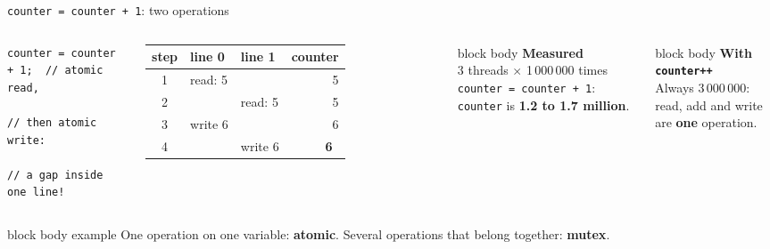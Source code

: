 \documentclass[aspectratio=169,10pt]{beamer}
\newcommand{\nok}{\textcolor{aWrite}{\faTimes}}
\newcommand{\stepbox}[2]{%
  \begin{beamercolorbox}[rounded=true,sep=0.09cm,wd=\linewidth]{block body}
    \footnotesize\textbf{#1}\\ #2
  \end{beamercolorbox}\vspace{0.06cm}}
\newcommand{\keymsg}[1]{%
  \begin{beamercolorbox}[rounded=true,sep=0.1cm,wd=\textwidth]{block body example}
    \centering\footnotesize #1
  \end{beamercolorbox}}
\begin{document}
\begin{frame}[fragile]{\texttt{counter = counter + 1}: two operations}
  \begin{columns}[c,onlytextwidth]
\begin{lstlisting}[style=cpp]
counter = counter + 1;  // atomic read,
                        // then atomic write:
                        // a gap inside one line!
\end{lstlisting}
      \vspace{0.2cm}
      \centering\footnotesize
      \renewcommand{\arraystretch}{1.15}
      \begin{tabular}{c l l r}
        \toprule
        \textbf{step} & \textbf{line 0} & \textbf{line 1} & \textbf{counter} \\
        \midrule
        1 & read: 5 & & 5 \\
        2 & & read: 5 & 5 \\
        3 & write 6 & & 6 \\
        \rowcolor{AccentOrange!12}
        4 & & write 6 & \textbf{6}\ \nok \\
        \bottomrule
      \end{tabular}
      \stepbox{Measured}{3 threads $\times$ 1\,000\,000 times \texttt{counter = counter + 1}: \texttt{counter} is
        \textbf{1.2 to 1.7 million}.}
      \stepbox{With \texttt{counter++}}{Always 3\,000\,000: read, add and write are \textbf{one} operation.}
  \end{columns}
  \vfill
  \keymsg{One operation on one variable: \textbf{atomic}. Several operations that belong together: \textbf{mutex}.}
\end{frame}
\end{document}
